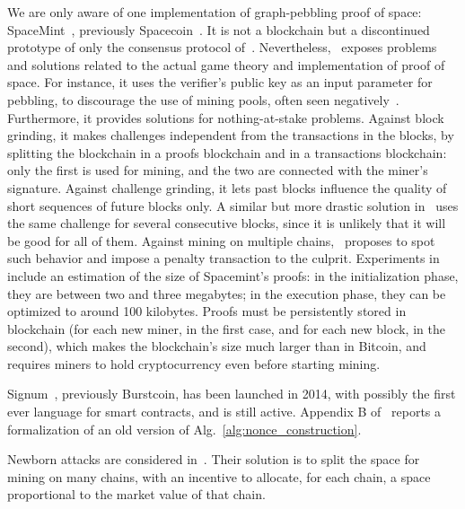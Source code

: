 We are only aware of one implementation of graph-pebbling proof of space:
SpaceMint~\cite{ParkKFGAP18}, previously Spacecoin~\cite{ParkPAFG15}.
It is not a blockchain
but a discontinued prototype of only the consensus protocol of~\cite{DziembowskiFKP15}.
Nevertheless, \cite{ParkKFGAP18}~exposes problems and solutions
related to the actual game theory and implementation of proof of space.
For instance, it uses the verifier's public key as an input parameter
for pebbling, to discourage the use of mining pools, often seen
negatively~\cite{MillerKKS15}.
Furthermore, it provides solutions for nothing-at-stake problems. Against block grinding,
it makes challenges independent from the transactions in the blocks, by splitting the
blockchain in a proofs blockchain and in a transactions blockchain:
only the first is used for mining,
and the two are connected with the miner's signature.
Against challenge grinding, it lets past blocks influence the quality of short sequences
of future blocks only. A similar but more drastic solution in~\cite{CohenP19}
uses the same challenge for several consecutive blocks,
since it is unlikely that it will be good for all of them.
Against mining on multiple chains, \cite{ParkKFGAP18}~proposes
to spot such behavior and impose a penalty transaction to the culprit.
%
Experiments in~\cite{ParkKFGAP18} include
an estimation of the size of Spacemint's proofs:
in the initialization phase, they are between two and three megabytes;
in the execution phase, they can be optimized to around 100 kilobytes.
Proofs must be persistently stored in
blockchain (for each new miner, in the first case, and for each new block, in the second),
which makes the blockchain's size much larger than in Bitcoin, and requires
miners to hold cryptocurrency even before starting mining.

Signum~\cite{Signum}, previously Burstcoin, has been launched in 2014, with possibly
the first ever language for smart contracts, and is still active.
Appendix B of~\cite{ParkKFGAP18} reports a formalization of an old version
of Alg.~\ref{alg:nonce_construction}.

Newborn attacks are considered in~\cite{TangZDWLG0L19}. Their solution is
to split the space for mining on many chains, with an
incentive to allocate, for each chain, a space proportional
to the market value of that chain.
